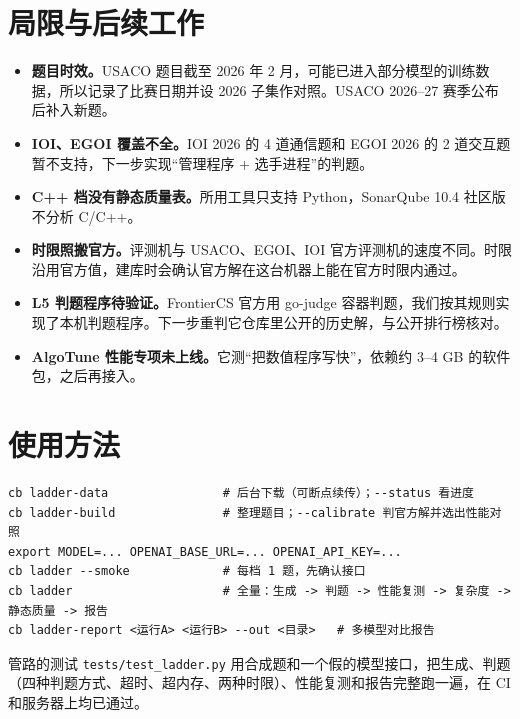 \documentclass[11pt,a4paper,fontset=none]{ctexart}
\begin{document}
\section{局限与后续工作}
\begin{itemize}
  \item \textbf{题目时效。}USACO 题目截至 2026 年 2 月，可能已进入部分模型的训练数据，所以记录了比赛日期并设 2026 子集作对照。USACO 2026--27 赛季公布后补入新题。
  \item \textbf{IOI、EGOI 覆盖不全。}IOI 2026 的 4 道通信题和 EGOI 2026 的 2 道交互题暂不支持，下一步实现“管理程序 + 选手进程”的判题。
  \item \textbf{C++ 档没有静态质量表。}所用工具只支持 Python，SonarQube 10.4 社区版不分析 C/C++。
  \item \textbf{时限照搬官方。}评测机与 USACO、EGOI、IOI 官方评测机的速度不同。时限沿用官方值，建库时会确认官方解在这台机器上能在官方时限内通过。
  \item \textbf{L5 判题程序待验证。}FrontierCS 官方用 go-judge 容器判题，我们按其规则实现了本机判题程序。下一步重判它仓库里公开的历史解，与公开排行榜核对。
  \item \textbf{AlgoTune 性能专项未上线。}它测“把数值程序写快”，依赖约 3--4 GB 的软件包，之后再接入。
\end{itemize}

\section{使用方法}
\begin{verbatim}
cb ladder-data                # 后台下载（可断点续传）；--status 看进度
cb ladder-build               # 整理题目；--calibrate 判官方解并选出性能对照
export MODEL=... OPENAI_BASE_URL=... OPENAI_API_KEY=...
cb ladder --smoke             # 每档 1 题，先确认接口
cb ladder                     # 全量：生成 -> 判题 -> 性能复测 -> 复杂度 -> 静态质量 -> 报告
cb ladder-report <运行A> <运行B> --out <目录>   # 多模型对比报告
\end{verbatim}
管路的测试 \texttt{tests/test\_ladder.py} 用合成题和一个假的模型接口，把生成、判题（四种判题方式、超时、超内存、两种时限）、性能复测和报告完整跑一遍，在 CI 和服务器上均已通过。
\end{document}
